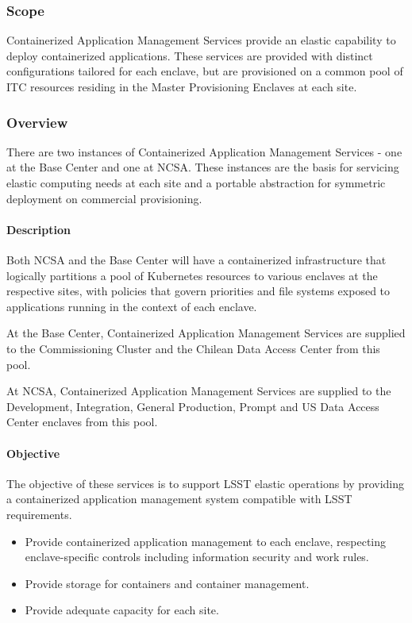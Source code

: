 \subsubsection{Scope}

Containerized Application Management Services provide an elastic capability to deploy containerized
applications. These services are provided with distinct configurations tailored for each enclave,
but are provisioned on a common pool of ITC resources residing in the Master Provisioning Enclaves at each site.

\subsubsection{Overview}

There are two instances of Containerized Application Management Services -
one at the Base Center and one at NCSA. These instances are the basis for servicing
elastic computing needs at each site and a portable abstraction for symmetric
deployment on commercial provisioning.

\paragraph{Description}

Both NCSA and the Base Center will have a containerized infrastructure that
logically partitions a pool of Kubernetes resources to various enclaves at the respective
sites, with policies that govern priorities and file systems exposed to
applications running in the context of each enclave.

At the Base Center, Containerized Application Management Services are supplied to the Commissioning
Cluster and the Chilean Data Access Center from this pool.

At NCSA, Containerized Application Management Services are supplied to the Development, Integration,
General Production, Prompt and US Data Access Center enclaves from this pool.

\paragraph{Objective}

The objective of these services is to support LSST elastic operations by providing a containerized application
management system compatible with LSST requirements.

\begin{itemize}

\item Provide containerized application management to each enclave, respecting enclave-specific controls including information security and work rules.

\item Provide storage for containers and container management.

\item Provide adequate capacity for each site.

\end{itemize}

